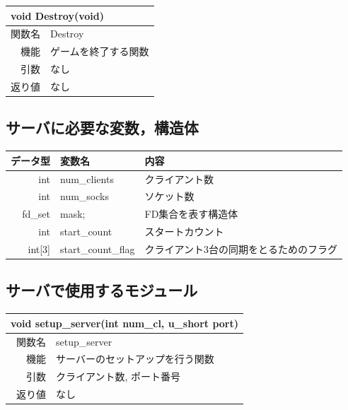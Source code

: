 \documentclass{jarticle}
\begin{document}
\begin{table}[H]
\begin{tabular}{|r|l|}
\hline
  \multicolumn{2}{|l|}{void Destroy(void)}       \\ \hline
関数名           & Destroy \\ \hline
機能     & ゲームを終了する関数 \\
引数     & なし \\
返り値   & なし \\ \hline
\end{tabular}
\end{table}


\subsection{サーバに必要な変数，構造体}
\begin{table}[H]
  \begin{tabular}{|r|l|l|}
    \hline
    データ型 & 変数名 & 内容 \\ \hline
    int & num\_clients& クライアント数 \\
    int & num\_socks & ソケット数 \\
    fd\_set & mask;  &FD集合を表す構造体 \\
    int & start\_count & スタートカウント \\
    int[3] & start\_count\_flag & クライアント3台の同期をとるためのフラグ \\ \hline
\end{tabular}
\end{table}

\subsection{サーバで使用するモジュール}

\begin{table}[H]
\begin{tabular}{|r|l|}
\hline
  \multicolumn{2}{|l|}{void setup\_server(int num\_cl, u\_short port)}       \\ \hline
関数名           & setup\_server \\ \hline
機能     & サーバーのセットアップを行う関数 \\
引数     & クライアント数, ポート番号 \\
返り値   & なし \\ \hline
\end{tabular}
\end{table}
\end{document}
